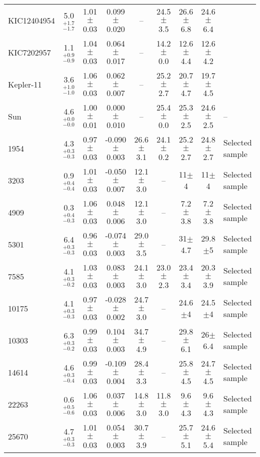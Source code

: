 \begin{table*}
\begin{tabular}{lcccccccl}
KIC12404954   &   5.0$_{-1.7}^{+1.7}$   &   1.01$\pm$0.03   &   0.099$\pm$0.020   &   --   &   24.5$\pm$3.5   & 26.6$\pm$6.8 & 24.6$\pm$6.4 &   \citet{mcquillan13} \\ 
KIC7202957   &   1.1$_{-0.9}^{+0.9}$   &   1.04$\pm$0.03   &   0.064$\pm$0.017   &   --   &   14.2$\pm$0.0   & 12.6$\pm$4.4 & 12.6$\pm$4.2 &   \citet{mcquillan13} \\ 
Kepler-11   &   3.6$_{-1.0}^{+1.0}$   &   1.06$\pm$0.03   &   0.062$\pm$0.007   &   --   &   25.2$\pm$2.7   & 20.7$\pm$4.7 & 19.7$\pm$4.5 &   \citet{mazeh15} \\ 
Sun   &   4.6$_{-0.0}^{+0.0}$   &   1.00$\pm$0.01   &   0.000$\pm$0.010   &   --   &   25.4$\pm$0.0   & 25.3$\pm$2.5 & 24.6$\pm$2.5 &   -- \\ 
\hline
1954 &   4.3$_{-0.3}^{+0.3}$   &   0.97$\pm$0.03   &   -0.090$\pm$0.003   &   26.6$\pm$3.1   &   24.1$\pm$0.2   & 25.2$\pm$2.7 & 24.8$\pm$2.7 &   Selected sample \\ 
3203 &   0.9$_{-0.4}^{+0.4}$   &   1.01$\pm$0.03   &   -0.050$\pm$0.007   &   12.1$\pm$3.0   &   --   & 11$\pm$4 & 11$\pm$4 &   Selected sample \\ 
4909 &   0.3$_{-0.3}^{+0.4}$   &   1.06$\pm$0.03   &   0.048$\pm$0.006   &   12.1$\pm$3.0   &   --   & 7.2$\pm$3.8 & 7.2$\pm$3.8 &   Selected sample \\ 
5301 &   6.4$_{-0.3}^{+0.3}$   &   0.96$\pm$0.03   &   -0.074$\pm$0.003   &   29.0$\pm$3.5   &   --   & 31$\pm$4.7 & 29.8$\pm$5 &   Selected sample \\ 
7585 &   4.1$_{-0.2}^{+0.3}$   &   1.03$\pm$0.03   &   0.083$\pm$0.003   &   24.1$\pm$3.0   &   23.0$\pm$2.3   & 23.4$\pm$3.4 & 20.3$\pm$3.9 &   Selected sample \\ 
10175 &   4.1$_{-0.3}^{+0.3}$   &   0.97$\pm$0.03   &   -0.028$\pm$0.002   &   24.7$\pm$3.0   &   --   & 24.6$\pm$4 & 24.5$\pm$4 &   Selected sample \\ 
10303 &   6.3$_{-0.2}^{+0.3}$   &   0.99$\pm$0.03   &   0.104$\pm$0.003   &   34.7$\pm$4.9   &   --   & 29.8$\pm$6.1 & 26$\pm$6.4 &   Selected sample \\ 
14614 &   4.6$_{-0.4}^{+0.3}$   &   0.99$\pm$0.03   &   -0.109$\pm$0.004   &   28.4$\pm$3.3   &   --   & 25.8$\pm$4.5 & 24.7$\pm$4.5 &   Selected sample \\ 
22263 &   0.6$_{-0.6}^{+0.5}$   &   1.06$\pm$0.03   &   0.037$\pm$0.006   &   14.8$\pm$3.0   &   11.8$\pm$3.0   & 9.6$\pm$4.3 & 9.6$\pm$4.3 &   Selected sample \\ 
25670 &   4.7$_{-0.3}^{+0.3}$   &   1.01$\pm$0.03   &   0.054$\pm$0.003   &   30.7$\pm$3.9   &   --   & 25.7$\pm$5.1 & 24.6$\pm$5.4 &   Selected sample \\ 

\end{tabular}
\end{table*}
